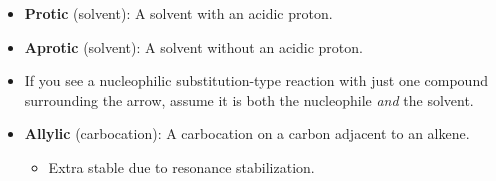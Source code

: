 \documentclass[../notes.tex]{subfiles}
\begin{document}
\begin{itemize}
\begin{enumerate}
\begin{itemize}
        \end{itemize}
    \end{enumerate}
    \item \textbf{Protic} (solvent): A solvent with an acidic proton.
    \item \textbf{Aprotic} (solvent): A solvent without an acidic proton.
    \item If you see a nucleophilic substitution-type reaction with just one compound surrounding the arrow, assume it is both the nucleophile \emph{and} the solvent.
    \item \textbf{Allylic} (carbocation): A carbocation on a carbon adjacent to an alkene.
    \begin{itemize}
        \item Extra stable due to resonance stabilization.
    \end{itemize}
\end{itemize}
\end{document}
